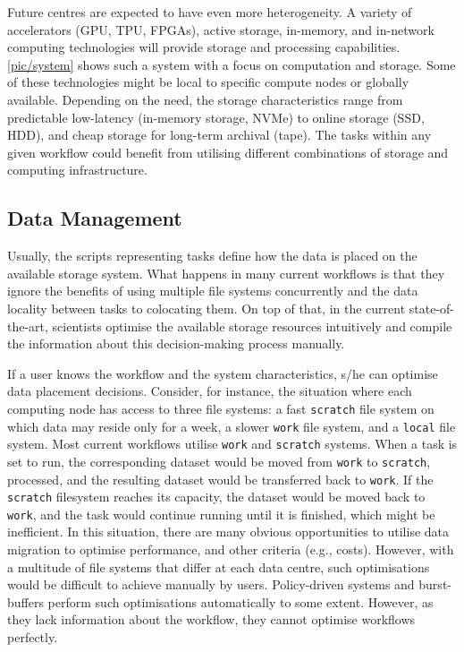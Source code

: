 \documentclass{superfri}
\begin{document}
Future centres are expected to have even more heterogeneity. A variety of accelerators (GPU, TPU, FPGAs), active storage, in-memory, and in-network computing technologies will provide storage and processing capabilities.
\cref{pic/system} shows such a system with a focus on computation and storage.
Some of these technologies might be local to specific compute nodes or globally available.
Depending on the need, the storage characteristics range from predictable low-latency (in-memory storage, NVMe) to online storage (SSD, HDD), and cheap storage for long-term archival (tape).
The tasks within any given workflow could benefit from utilising different combinations of storage and computing infrastructure.

\subsection{Data Management}
\label{sec:datamanagement}

Usually, the scripts representing tasks define how the data is placed on the available storage system.
What happens in many current workflows is that they ignore the benefits of using multiple file systems concurrently and the data locality between tasks to colocating them.
On top of that, in the current state-of-the-art, scientists optimise the available storage resources intuitively and compile the information about this decision-making process manually.

If a user knows the workflow and the system characteristics, s/he can optimise data placement decisions.
Consider, for instance, the situation where each computing node has access to three file systems: a fast \texttt{scratch} file system on which data may reside only for a week, a slower \texttt{work} file system, and a \texttt{local} file system.
Most current workflows utilise \texttt{work} and \texttt{scratch} systems.
When a task is set to run, the corresponding dataset would be moved from \texttt{work} to \texttt{scratch}, processed, and the resulting dataset would be transferred back to \texttt{work}.
If the \texttt{scratch} filesystem reaches its capacity, the dataset would be moved back to \texttt{work}, and the task would continue running until it is finished, which might be inefficient.
In this situation, there are many obvious opportunities to utilise data migration to optimise performance, and other criteria (e.g., costs).
However, with a multitude of file systems that differ at each data centre, such optimisations would be difficult to achieve manually by users.
Policy-driven systems and burst-buffers perform such optimisations automatically to some extent. However, as they lack information about the workflow, they cannot optimise workflows perfectly.
\end{document}
